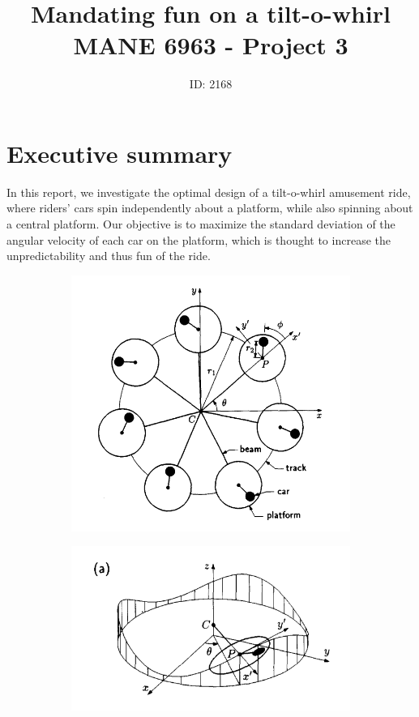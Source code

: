 \documentclass[11pt]{article}
\title{Mandating fun on a tilt-o-whirl\\MANE 6963 - Project 3}
\author{ID: 2168}
\date{}
\begin{document}
\maketitle

\section{Executive summary}

In this report, we investigate the optimal design of a
tilt-o-whirl amusement ride, where riders' cars spin
independently about a platform, while also spinning
about a central platform. Our objective is to maximize
the standard deviation of the angular velocity of each
car on the platform, which is thought to increase
the unpredictability and thus fun of the ride.

\begin{figure}[hbt!]
\centering
\begin{subfigure}{.25\textwidth}
\centering
\includegraphics[width=.99\linewidth]{ride1}
\end{subfigure}%
\begin{subfigure}{.25\textwidth}
\centering
\includegraphics[width=.99\linewidth]{ride2}

\end{subfigure}
\end{figure}
\end{document}
